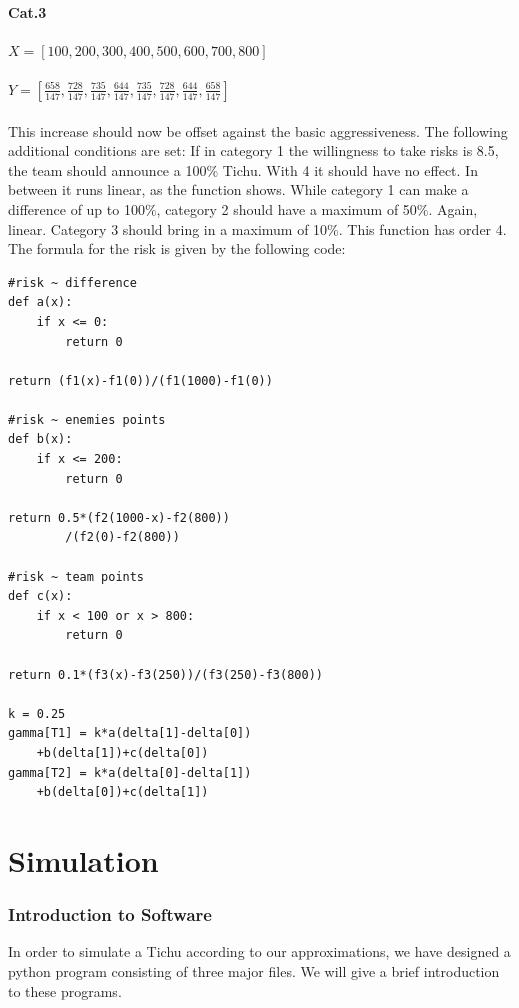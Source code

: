 \paragraph{Cat.3}\par
$X=[100,200,300,400,500,600,700,800]$\\ \\
$Y=[\frac{658}{147},\frac{728}{147},\frac{735}{147},\frac{644}{147},\frac{735}{147},\frac{728}{147},\frac{644}{147},\frac{658}{147}]$
\\
\\
This increase should now be offset against the basic aggressiveness.
The following additional conditions are set:
If in category 1 the willingness to take risks is 8.5, the team should announce a 100$\%$ Tichu. With 4 it should have no effect.  In between it runs linear, as the function shows.
While category 1 can make a difference of up to 100$\%$, category 2 should have a maximum of 50$\%$. Again, linear.
Category 3 should bring in a maximum of 10$\%$. This function has order 4. The formula for the risk is given by the following code:
\begin{lstlisting}
#risk ~ difference
def a(x):
    if x <= 0:
        return 0
            
return (f1(x)-f1(0))/(f1(1000)-f1(0))
            
#risk ~ enemies points
def b(x):
    if x <= 200:
        return 0
            
return 0.5*(f2(1000-x)-f2(800))
		/(f2(0)-f2(800))
        
#risk ~ team points
def c(x):
    if x < 100 or x > 800:
        return 0
            
return 0.1*(f3(x)-f3(250))/(f3(250)-f3(800))

k = 0.25    
gamma[T1] = k*a(delta[1]-delta[0])
	+b(delta[1])+c(delta[0]) 
gamma[T2] = k*a(delta[0]-delta[1])
	+b(delta[0])+c(delta[1])

\end{lstlisting}

\section{Simulation}
\subsubsection{Introduction to Software}
In order to simulate a Tichu according to our approximations, we have designed a python program consisting of three major files. We will give a brief introduction to these programs.

